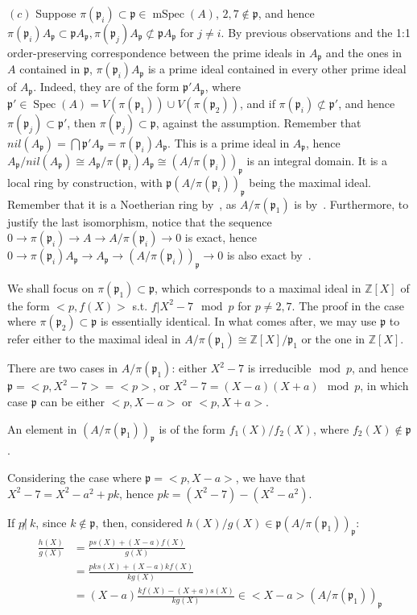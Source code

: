 \documentclass{article}
\newcommand{\numberset}{\mathbb}
\newcommand{\Z}{\numberset{Z}}
\newcommand{\pid}{\mathfrak{p}}
\DeclareMathOperator{\Spec}{Spec}
\DeclareMathOperator{\mSpec}{mSpec}
\begin{document}
$(c)$ Suppose $\pi(\pid_i)\subset\pid\in\mSpec(A)$, $2,7\not\in\pid$, and hence $\pi(\pid_i) A_{\pid}\subset\pid A_{\pid},\pi(\pid_j) A_{\pid}\not\subset\pid A_{\pid}$ for $j\neq i$. By previous observations and the 1:1 order-preserving correspondence between the prime ideals in $A_{\pid}$ and the ones in $A$ contained in $\pid$, $\pi(\pid_i)A_{\pid}$ is a prime ideal contained in every other prime ideal of $A_{\pid}$. Indeed, they are of the form $\pid'A_{\pid}$, where $\pid'\in\Spec(A)=V(\pi(\pid_1))\cup V(\pi(\pid_2))$, and if $\pi(\pid_i)\not\subset\pid'$, and hence $\pi(\pid_j)\subset\pid'$, then $\pi(\pid_j)\subset\pid$, against the assumption. Remember that $nil(A_{\pid})=\bigcap \pid'A_{\pid}=\pi(\pid_i) A_{\pid}$. This is a prime ideal in $A_{\pid}$, hence $A_{\pid}/nil(A_{\pid})\cong A_{\pid}/\pi(\pid_i)A_{\pid}\cong (A/\pi(\pid_i))_{\pid}$ is an integral domain. It is a local ring by construction, with $\pid(A/\pi(\pid_i))_{\pid}$ being the maximal ideal. Remember that it is a Noetherian ring by~\cite[cor. 7.4]{atm}, as $A/\pi(\pid_1)$ is by~\cite[cor. 7.1]{atm}. Furthermore, to justify the last isomorphism, notice that the sequence $0\rightarrow\pi(\pid_i)\rightarrow A\rightarrow A/\pi(\pid_i)\rightarrow 0$ is exact, hence $0\rightarrow\pi(\pid_i) A_{\pid}\rightarrow A_{\pid}\rightarrow (A/\pi(\pid_i))_{\pid}\rightarrow 0$ is also exact by~\cite[prop. 3.3]{atm}.

We shall focus on $\pi(\pid_1)\subset\pid$, which corresponds to a maximal ideal in $\Z[X]$ of the form $<p,f(X)>$ s.t. $f|X^2-7 \mod p$ for $p\neq 2,7$. The proof in the case where $\pi(\pid_2)\subset\pid$ is essentially identical. In what comes after, we may use $\pid$ to refer either to the maximal ideal in $A/\pi(\pid_1)\cong\Z[X]/\pid_1$ or the one in $\Z[X]$.

There are two cases in $A/\pi(\pid_1)$: either $X^2-7$ is irreducible$\mod p$, and hence $\pid=<p,X^2-7>=<p>$, or $X^2-7=(X-a)(X+a) \mod p$, in which case $\pid$ can be either $<p,X-a>$ or $<p,X+a>$.

An element in $(A/\pi(\pid_1))_{\pid}$ is of the form $f_1(X)/f_2(X)$, where $f_2(X)\not\in\pid$.

Considering the case where $\pid=<p,X-a>$, we have that $X^2-7=X^2-a^2+pk$, hence $pk=(X^2-7)-(X^2-a^2)$.

If $p\not |\ k$, since $k\not\in\pid$, then, considered $h(X)/g(X)\in\pid(A/\pi(\pid_1))_{\pid}$:
\begin{align*}
  \frac{h(X)}{g(X)} & = \frac{ps(X)+(X-a)f(X)}{g(X)} \\
  & = \frac{pks(X)+(X-a)kf(X)}{kg(X)} \\
  & = (X-a)\frac{kf(X)-(X+a)s(X)}{kg(X)}\in <X-a>(A/\pi(\pid_1))_{\pid}
\end{align*}
\end{document}
